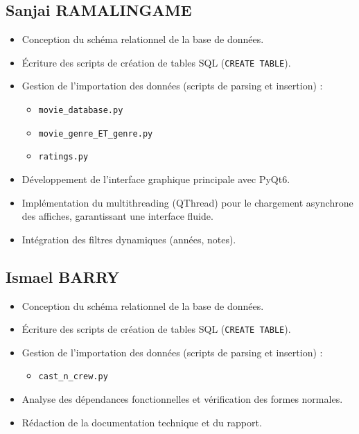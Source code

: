\documentclass[12pt]{article}
\begin{document}
\subsection{Sanjai RAMALINGAME}
\begin{itemize}
    \item Conception du schéma relationnel de la base de données.
    \item Écriture des scripts de création de tables SQL (\texttt{CREATE TABLE}).
    \item Gestion de l'importation des données (scripts de parsing et insertion) :
    \begin{itemize}
        \item \texttt{movie\_database.py}
        \item \texttt{movie\_genre\_ET\_genre.py}
        \item \texttt{ratings.py}
    \end{itemize}
    \item Développement de l'interface graphique principale avec PyQt6.
    \item Implémentation du multithreading (QThread) pour le chargement asynchrone des affiches, garantissant une interface fluide.
    \item Intégration des filtres dynamiques (années, notes).
\end{itemize}

\subsection{Ismael BARRY}
\begin{itemize}
    \item Conception du schéma relationnel de la base de données.
    \item Écriture des scripts de création de tables SQL (\texttt{CREATE TABLE}).
    \item Gestion de l'importation des données (scripts de parsing et insertion) :
    \begin{itemize}
        \item \texttt{cast\_n\_crew.py}
    \end{itemize}
    \item Analyse des dépendances fonctionnelles et vérification des formes normales.
    \item Rédaction de la documentation technique et du rapport.
\end{itemize}
\end{document}
